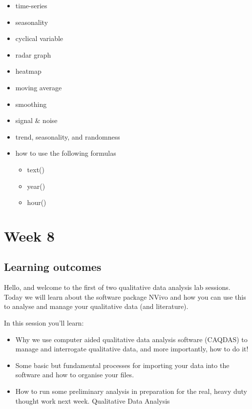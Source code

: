 \documentclass[
]{book}
\providecommand{\tightlist}{%
  \setlength{\itemsep}{0pt}\setlength{\parskip}{0pt}}
\begin{document}
\begin{itemize}
\tightlist
\item
  time-series
\item
  seasonality
\item
  cyclical variable
\item
  radar graph
\item
  heatmap
\item
  moving average
\item
  smoothing
\item
  signal \& noise
\item
  trend, seasonality, and randomness
\item
  how to use the following formulas

  \begin{itemize}
  \tightlist
  \item
    text()
  \item
    year()
  \item
    hour()
  \end{itemize}
\end{itemize}

\hypertarget{week8}{%
\chapter{Week 8}\label{week8}}

\hypertarget{learning-outcomes-7}{%
\section{Learning outcomes}\label{learning-outcomes-7}}

Hello, and welcome to the first of two qualitative data analysis lab sessions. Today we will learn about the software package NVivo and how you can use this to analyse and manage your qualitative data (and literature).

In this session you'll learn:

\begin{itemize}
\tightlist
\item
  Why we use computer aided qualitative data analysis software (CAQDAS) to manage and interrogate qualitative data, and more importantly, how to do it!
\item
  Some basic but fundamental processes for importing your data into the software and how to organise your files.
\item
  How to run some preliminary analysis in preparation for the real, heavy duty thought work next week. Qualitative Data Analysis
\end{itemize}
\end{document}
